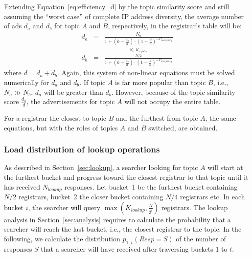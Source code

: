 Extending Equation~\ref{eq:efficiency_d} by the topic similarity score and still assuming the ``worst case'' of complete IP address diversity, the average number of ads $d_a$ and $d_b$ for topic $A$ and $B$, respectively, in the registrar's table will be:
\begin{eqnarray}
d_a & = & \frac{N_a}{1 + (b + \frac{d_a}{d}) \cdot (1 - \frac{d}{n})^{-P_{occupancy}}}\label{eq:da_fair}\\
d_b & = & \frac{\frac{N_b\cdot K_{register}}{N/2}}{1 + (b + \frac{d_b}{d}) \cdot (1 - \frac{d}{n})^{-P_{occupancy}}}\label{eq:da_fair2}
\end{eqnarray}
where $d = d_a + d_b$. Again, this system of non-linear equations must be solved numerically for $d_a$ and $d_b$.
If topic $A$ is far more popular than topic $B$, i.e., $N_a \gg N_b$, $d_a$ will be greater than $d_b$. However, because of the topic similarity score $\frac{d_a}{d}$, the advertisements for topic $A$ will not occupy the entire table.

For a registrar the closest to topic $B$ and the furthest from topic $A$, the same equations, but with the roles of topics $A$ and $B$ switched, are obtained.

\subsubsection{Load distribution of lookup operations}

As described in Section~\ref{sec:lookup}, a searcher looking for topic $A$ will start at the furthest bucket and progress toward the closest registrar to that topic until it has received $N_{lookup}$ responses.
Let bucket~1 be the furthest bucket containing $N/2$ registrars, bucket~2 the closer bucket containing $N/4$ registrars etc. In each bucket $i$, the searcher will query $\max(K_{lookup}, \frac{N}{2^i})$ registrars.
The lookup analysis in Section~\ref{sec:analysis} requires to calculate the probability that a searcher will reach the last bucket, i.e., the closest registrar to the topic. In the following, we calculate the distribution $p_{1..t}(Resp=S)$ of the number of responses $S$ that a searcher will have received after traversing buckets 1 to $t$.

